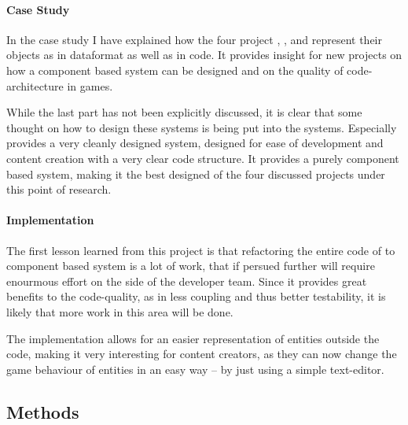 \paragraph{Case Study}
In the case study I have explained how the four project \UH{}, \BOW{}, \GLEST{} and \AD{} represent their objects as
in dataformat as well as in code. It provides insight for new projects on how a component based system can be designed
and on the quality of code-architecture in \OS{} games.

While the last part has not been explicitly discussed, it is clear that some thought on how to design these systems is
being put into the systems. Especially \AD{} provides a very cleanly designed system, designed for ease of development
and content creation with a very clear code structure.
It provides a purely component based system, making it the best designed of the four discussed projects under this point
of research.

\paragraph{Implementation}
The first lesson learned from this project is that refactoring the entire code of \UH{} to component based system is a
lot of work, that if persued further will require enourmous effort on the side of the developer team. Since it provides
great benefits to the code-quality, as in less coupling and thus better testability, it is likely that more work in this
area will be done.

The implementation allows for an easier representation of entities outside the code, making it very interesting
for content creators, as they can now change the game behaviour of entities in an easy way -- by just using a simple
text-editor.


\subsection{Methods}
